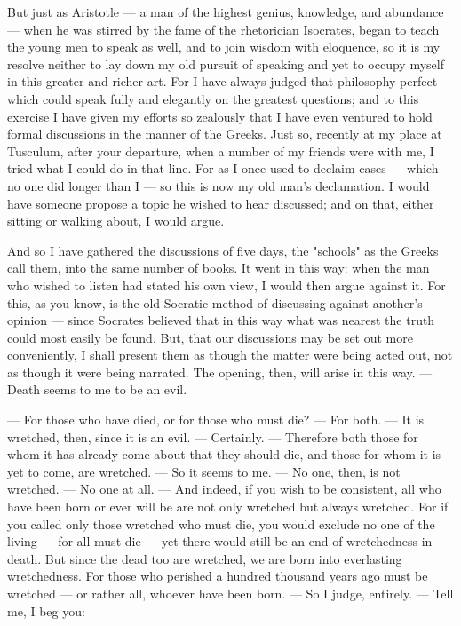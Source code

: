  But just as Aristotle — a man of the highest genius, knowledge, and abundance — when he was stirred by the fame of the rhetorician Isocrates, began to teach the young men to speak as well, and to join wisdom with eloquence, so it is my resolve neither to lay down my old pursuit of speaking and yet to occupy myself in this greater and richer art. For I have always judged that philosophy perfect which could speak fully and elegantly on the greatest questions; and to this exercise I have given my efforts so zealously that I have even ventured to hold formal discussions in the manner of the Greeks. Just so, recently at my place at Tusculum, after your departure, when a number of my friends were with me, I tried what I could do in that line. For as I once used to declaim cases — which no one did longer than I — so this is now my old man's declamation. I would have someone propose a topic he wished to hear discussed; and on that, either sitting or walking about, I would argue.

 And so I have gathered the discussions of five days, the "schools" as the Greeks call them, into the same number of books. It went in this way: when the man who wished to listen had stated his own view, I would then argue against it. For this, as you know, is the old Socratic method of discussing against another's opinion — since Socrates believed that in this way what was nearest the truth could most easily be found. But, that our discussions may be set out more conveniently, I shall present them as though the matter were being acted out, not as though it were being narrated. The opening, then, will arise in this way. — Death seems to me to be an evil.

 — For those who have died, or for those who must die? — For both. — It is wretched, then, since it is an evil. — Certainly. — Therefore both those for whom it has already come about that they should die, and those for whom it is yet to come, are wretched. — So it seems to me. — No one, then, is not wretched. — No one at all. — And indeed, if you wish to be consistent, all who have been born or ever will be are not only wretched but always wretched. For if you called only those wretched who must die, you would exclude no one of the living — for all must die — yet there would still be an end of wretchedness in death. But since the dead too are wretched, we are born into everlasting wretchedness. For those who perished a hundred thousand years ago must be wretched — or rather all, whoever have been born. — So I judge, entirely. — Tell me, I beg you:


